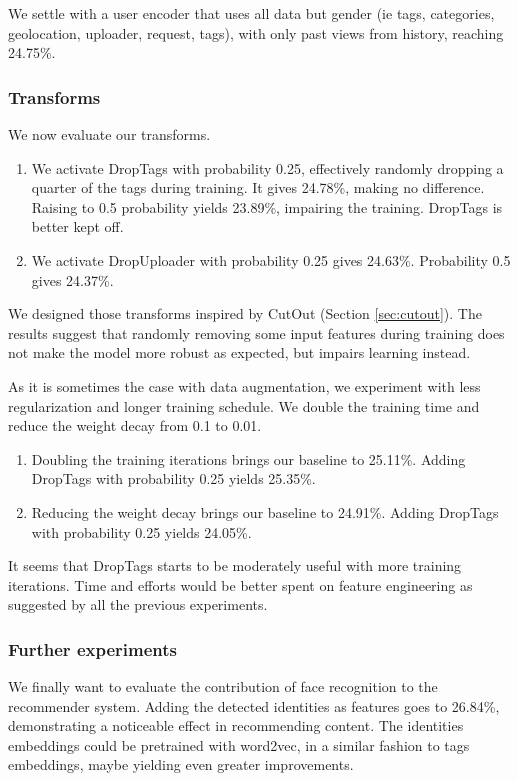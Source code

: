 We settle with a user encoder that uses all data but gender (ie tags, categories, geolocation, uploader, request, tags), with only past views from history, reaching 24.75\%.

\subsubsection{Transforms}

We now evaluate our transforms.

\begin{enumerate}
    \item We activate DropTags with probability 0.25, effectively randomly dropping a quarter of the tags during training. It gives 24.78\%, making no difference. Raising to 0.5 probability yields 23.89\%, impairing the training. DropTags is better kept off.
    \item We activate DropUploader with probability 0.25 gives 24.63\%. Probability 0.5 gives 24.37\%.
\end{enumerate}

We designed those transforms inspired by CutOut \cite{cutout} (Section \ref{sec:cutout}). The results suggest that randomly removing some input features during training does not make the model more robust as expected, but impairs learning instead.

As it is sometimes the case with data augmentation, we experiment with less regularization and longer training schedule. We double the training time and reduce the weight decay from 0.1 to 0.01.

\begin{enumerate}
    \item Doubling the training iterations brings our baseline to 25.11\%. Adding DropTags with probability 0.25 yields 25.35\%.
    \item Reducing the weight decay brings our baseline to 24.91\%. Adding DropTags with probability 0.25 yields 24.05\%.
\end{enumerate}

It seems that DropTags starts to be moderately useful with more training iterations. Time and efforts would be better spent on feature engineering as suggested by all the previous experiments.

\subsubsection{Further experiments}
We finally want to evaluate the contribution of face recognition to the recommender system. Adding the detected identities as features goes to 26.84\%, demonstrating a noticeable effect in recommending content. The identities embeddings could be pretrained with word2vec, in a similar fashion to tags embeddings, maybe yielding even greater improvements.

